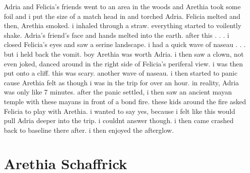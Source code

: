 \documentclass[12pt]{book}
\begin{document}
Adria and Felicia's friends went to an area in the woods and Arethia took some foil and i put the size of a match head in and torched Adria. Felicia melted and then, Arethia smoked. i inhaled through a straw. everything started to voilently shake. Adria's friend's face and hands melted into the earth. after this . . .  i closed Felicia's eyes and saw a serine landscape. i had a quick wave of naseau . . .  but i held back the vomit. boy Arethia was worth Adria. i then saw a clown, not even joked, danced around in the right side of Felicia's periferal view. i was then put onto a cliff. this was scary. another wave of naseau. i then started to panic cause Arethia felt as though i was in the trip for over an hour. in reality, Adria was only like 7 minutes. after the panic settled, i then saw an ancient mayan temple with these mayans in front of a bond fire. these kids around the fire asked Felicia to play with Arethia. i wanted to say yes, because i felt like this would pull Adria deeper into the trip. i couldnt answer though. i then came crashed back to baseline there after. i then enjoyed the afterglow.



\chapter{Arethia Schaffrick}
\end{document}
